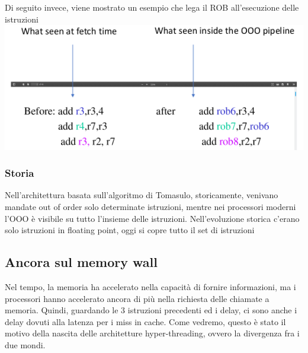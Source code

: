 \documentclass[12pt, oneside]{extbook}
\begin{document}
\newpage
Di seguito invece, viene mostrato un esempio che lega il ROB all'esecuzione delle istruzioni\\
\includegraphics[scale=0.6]{immagini/rob}
\subsubsection{Storia}
Nell'architettura basata sull'algoritmo di Tomasulo, storicamente, venivano mandate out of order solo determinate istruzioni, mentre nei processori moderni l'OOO è visibile su tutto l'insieme delle istruzioni. Nell'evoluzione storica c'erano solo istruzioni in floating point, oggi si copre tutto il set di istruzioni
\subsection{Ancora sul memory wall}
Nel tempo, la memoria ha accelerato nella capacità di fornire informazioni, ma i processori hanno accelerato ancora di più nella richiesta delle chiamate a memoria. Quindi, guardando le 3 istruzioni precedenti ed i delay, ci sono anche i delay dovuti alla latenza per i miss in cache. Come vedremo, questo è stato il motivo della nascita delle architetture hyper-threading, ovvero la divergenza fra i due mondi.
\end{document}
